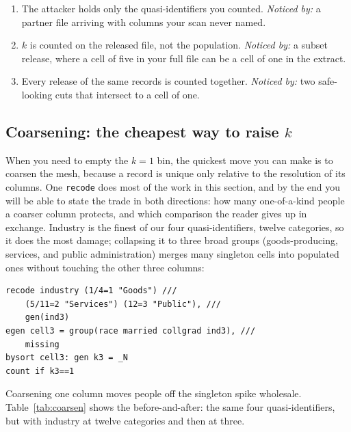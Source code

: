 \documentclass[
    a4paper,
    fontsize=10pt,
    twoside=true,
    numbers=noenddot,
]{kaobook}
\newenvironment{restson}[1][What this depends on]{%
    \begin{restsonbox}[frametitle={#1}]%
}{%
    \end{restsonbox}%
}
\begin{document}
\begin{restson}[What the $k$-anonymity number depends on]
\begin{enumerate}
\item The attacker holds only the quasi-identifiers you counted. \emph{Noticed by:} a partner file arriving with columns your scan never named.
\item $k$ is counted on the released file, not the population. \emph{Noticed by:} a subset release, where a cell of five in your full file can be a cell of one in the extract.
\item Every release of the same records is counted together. \emph{Noticed by:} two safe-looking cuts that intersect to a cell of one.
\end{enumerate}
\end{restson}

\subsection{Coarsening: the cheapest way to raise \texorpdfstring{$k$}{k}}\label{sec:coarsen}
When you need to empty the $k=1$ bin, the quickest move you can make is to coarsen the mesh, because a record is unique only relative to the resolution of its columns. One \texttt{recode} does most of the work in this section, and by the end you will be able to state the trade in both directions: how many one-of-a-kind people a coarser column protects, and which comparison the reader gives up in exchange. Industry is the finest of our four quasi-identifiers, twelve categories, so it does the most damage; collapsing it to three broad groups (goods-producing, services, and public administration) merges many singleton cells into populated ones without touching the other three columns:
\par
{\footnotesize
\begin{verbatim}
recode industry (1/4=1 "Goods") ///
    (5/11=2 "Services") (12=3 "Public"), ///
    gen(ind3)
egen cell3 = group(race married collgrad ind3), ///
    missing
bysort cell3: gen k3 = _N
count if k3==1
\end{verbatim}
}
Coarsening one column moves people off the singleton spike wholesale. Table~\ref{tab:coarsen} shows the before-and-after: the same four quasi-identifiers, but with industry at twelve categories and then at three.
\end{document}
